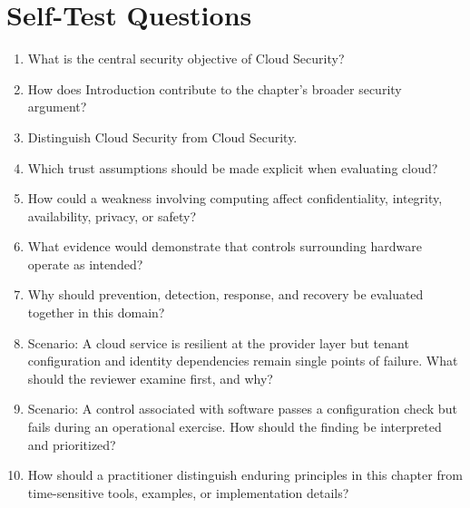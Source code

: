 \documentclass[11pt]{article}
\begin{document}
\section*{Self-Test Questions}
\begin{enumerate}
\item What is the central security objective of Cloud Security?
\item How does Introduction contribute to the chapter's broader security argument?
\item Distinguish Cloud Security from Cloud Security.
\item Which trust assumptions should be made explicit when evaluating cloud?
\item How could a weakness involving computing affect confidentiality, integrity, availability, privacy, or safety?
\item What evidence would demonstrate that controls surrounding hardware operate as intended?
\item Why should prevention, detection, response, and recovery be evaluated together in this domain?
\item Scenario: A cloud service is resilient at the provider layer but tenant configuration and identity dependencies remain single points of failure. What should the reviewer examine first, and why?
\item Scenario: A control associated with software passes a configuration check but fails during an operational exercise. How should the finding be interpreted and prioritized?
\item How should a practitioner distinguish enduring principles in this chapter from time-sensitive tools, examples, or implementation details?
\end{enumerate}
\end{document}
